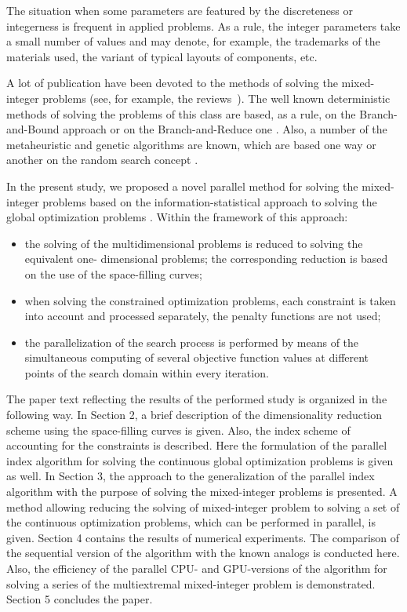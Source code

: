 \documentclass{llncs}
\begin{document}
The situation when some parameters are featured by the discreteness or integerness is frequent 
in applied problems. As a rule, the integer parameters take a small number of values and may 
denote, for example, the trademarks of the materials used, the variant of typical layouts of 
components, etc.

A lot of publication have been devoted to the methods of solving the mixed-integer problems 
(see, for example, the reviews~\cite{Burer,Boukouvala}). The well known deterministic 
methods of solving the problems of this class are based, as a rule, on the Branch-and-Bound 
approach \cite{Belotti} or on the Branch-and-Reduce one \cite{Vigerske}. Also, a number of 
the metaheuristic and genetic 
algorithms are known, which are based one way or another on the random search concept 
\cite{Deep,Schluter}.

In the present study, we proposed a novel parallel method for solving the mixed-integer 
problems based on the information-statistical approach to solving the global optimization 
problems \cite{Strongin2000,Strongin2013}. 
Within the framework of this approach: 
\begin{itemize}
	\item 
	the solving of the multidimensional problems is reduced to solving the equivalent one-
dimensional problems; the corresponding reduction is based on the use of the space-filling 
curves;
	\item 
	when solving the constrained optimization problems, each constraint is taken into 
account and processed separately, the penalty functions are not used;
	\item 
	the parallelization of the search process is performed by means of the simultaneous 
computing of several objective function values at different points of the search domain within 
every iteration.
\end{itemize}

The paper text reflecting the results of the performed study is organized in the following way. 
In Section 2, a brief description of the dimensionality reduction scheme using the space-filling 
curves is given. Also, the index scheme of accounting for the constraints is described. Here the 
formulation of the parallel index algorithm for solving the continuous global optimization 
problems is given as well.
In Section 3, the approach to the generalization of the parallel index algorithm with the purpose 
of solving the mixed-integer problems is presented. A method allowing reducing the solving of 
mixed-integer problem to solving a set of the continuous optimization problems, which can be 
performed in parallel, is given. 
Section 4 contains the results of numerical experiments. The comparison of the sequential 
version of the algorithm with the known analogs is conducted here. Also, the efficiency of the 
parallel CPU- and GPU-versions of the algorithm for solving a series of the multiextremal 
mixed-integer problem is demonstrated. 
Section 5 concludes the paper.
\end{document}
